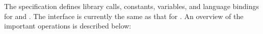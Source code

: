 
The \openshmem specification defines library calls, constants, variables, and language bindings for \Clang{} and \Fortran{}.
The \Cpp{} interface is currently the same as that for \Clang. An overview of the important \openshmem operations is described below:

